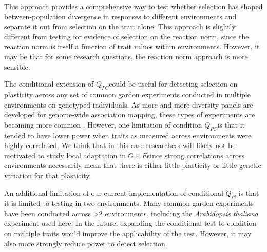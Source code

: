 \documentclass[11pt,letterpaper]{article}
\newcommand{\emjo}[1]{\todo[size=\scriptsize, color=purple!50]{#1}}
\newcommand{\gxe}{$G \times E$}
\newcommand{\qpc}{$Q_{PC}$}
\begin{document}
This approach provides a comprehensive way to test whether selection has shaped between-population divergence in responses to different environments and separate it out from selection on the trait alone. 
This approach is slightly different from testing for evidence of selection on the reaction norm, since the reaction norm is itself a function of trait values within environments. 
However, it may be that for some research questions, the reaction norm approach is more sensible. \emjo{um gotta think of when}


The conditional extension of \qpc could be useful for detecting selection on plasticity across any set of common garden experiments conducted in multiple environments on genotyped individuals.
As more and more diversity panels are developed for genome-wide association mapping, these types of experiments are becoming more common \citep{mead2026variation, MacQueen_2025, fournier2011map}.
However, one limitation of condition \qpc is that it tended to have lower power when traits as measured across environments were highly correlated.
We think that in this case researchers will likely not be motivated to study local adaptation in \gxe since strong correlations across environments necessarily mean that there is either little plasticity or little genetic variation for that plasticity.

An additional limitation of our current implementation of conditional \qpc is that it is limited to testing in two environments.
Many common garden experiments have been conducted across >2 environments, including the \textit{Arabidopsis thaliana} experiment used here.
In the future, expanding the conditional test to condition on multiple traits would improve the applicability of the test.
However, it may also more strongly reduce power to detect selection.


\end{document}
